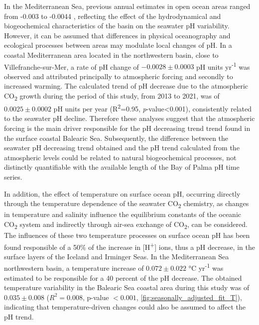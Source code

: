 In the Mediterranean Sea, previous annual estimates in open ocean areas
ranged from -0.003 to -0.0044 \cite{yao2016,Flecha2015}, reflecting the effect
of the hydrodynamical and biogeochemical characteristics of the basin on the
seawater pH variability\cite{lee2011,Palmieri2015,schneider2010}. However, it
can be assumed that differences in physical oceanography and ecological
processes between areas may modulate local changes of pH. In a coastal
Mediterranean area located in the northwestern basin, close to
Villefranche-sur-Mer, a rate of pH change of $-0.0028\pm 0.0003$ pH units
yr\textsuperscript{-1} was observed\cite{Kapsenberg2017} and attributed
principally to atmospheric forcing and secondly to increased warming.
The calculated trend of pH decrease due to the atmospheric
CO\textsubscript{2} growth during the period of this study, from 2013 to 2021,
was of $0.0025\pm 0.0002$ pH units per year (R\textsuperscript{2}=0.95,
\emph{p}-value<0.001), consistently related to the seawater pH decline.
Therefore these analyses suggest that the atmospheric forcing is the main
driver responsible for the pH decreasing trend trend found in the surface
coastal Balearic Sea. Subsequently, the difference between the seawater pH
decreasing trend obtained and the pH trend calculated from the atmospheric
levels could be related to natural biogeochemical processes, not distinctly
quantifiable with the available length of the Bay of Palma pH time series.

In addition, the effect of temperature on surface ocean pH, occurring
directly through the temperature dependence of the seawater CO\textsubscript{2}
chemistry, as changes in temperature and salinity influence the equilibrium
constants of the oceanic CO\textsubscript{2} system and indirectly through
air-sea exchange of CO\textsubscript{2}, can be considered. The influences of
these two temperature processes on surface ocean pH has been found responsible
of a 50\% of the increase in [H\textsuperscript{+}] ions, thus a pH decrease,
in the surface layers of the Iceland and Irminger
Seas\cite{perez2021contrasting}. In the Mediterranean Sea northwestern basin, a
temperature increase of $0.072\pm 0.022$ °C yr\textsuperscript{-1} was
estimated to be responsible for a 40 percent of the pH
decrease\cite{Kapsenberg2017}. The obtained temperature variability in the
Balearic Sea coastal area during this study was of $0.035\pm 0.008$
($R^2=0.008$, p-value $<0.001$, \cref{fig:seasonally_adjusted_fit_T}),
indicating that temperature-driven changes could also be assumed to affect the
pH trend.

